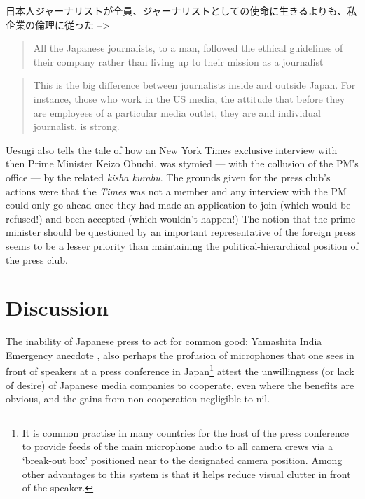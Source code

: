 \documentclass[11pt, headings=normal]{scrartcl}
\begin{document}
日本人ジャーナリストが全員、ジャーナリストとしての使命に生きるよりも、私企業の倫理に従った
\autocite[p37]{Yamashita:1996} --\textgreater{}

\begin{quote}
All the Japanese journalists, to a man, followed the ethical guidelines
of their company rather than living up to their mission as a journalist
\autocite[p37]{Yamashita:1996}
\end{quote}

\begin{quote}
This is the big difference between journalists inside and outside Japan.
For instance, those who work in the US media, the attitude that before
they are employees of a particular media outlet, they are and individual
journalist, is strong. \autocite[115]{Uesugi:2008}
\end{quote}

Uesugi also tells the tale of how an New York Times exclusive interview
with then Prime Minister Keizo Obuchi, was stymied --- with the
collusion of the PM's office --- by the related \emph{kisha kurabu}. The
grounds given for the press club's actions were that the \emph{Times}
was not a member and any interview with the PM could only go ahead once
they had made an application to join (which would be refused!) and been
accepted (which wouldn't happen!) \autocite[95--6]{Uesugi:2008} The
notion that the prime minister should be questioned by an important
representative of the foreign press seems to be a lesser priority than
maintaining the political-hierarchical position of the press club.

\hypertarget{discussion}{%
\section{Discussion}\label{discussion}}

The inability of Japanese press to act for common good: Yamashita India
Emergency anecdote \autocite[p35--6]{Yamashita:1996}, also perhaps the
profusion of microphones that one sees in front of speakers at a press
conference in Japan\footnote{It is common practise in many countries for
  the host of the press conference to provide feeds of the main
  microphone audio to all camera crews via a `break-out box' positioned
  near to the designated camera position. Among other advantages to this
  system is that it helps reduce visual clutter in front of the speaker.}
attest the unwillingness (or lack of desire) of Japanese media companies
to cooperate, even where the benefits are obvious, and the gains from
non-cooperation negligible to nil.
\end{document}
